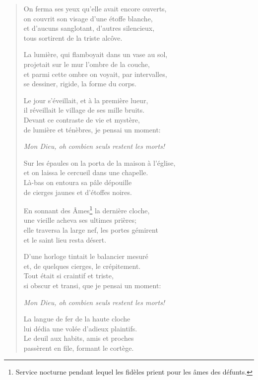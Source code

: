\begin{verse}
  On ferma ses yeux
  qu'elle avait encore ouverts, \\
  on couvrit son visage
  d'une étoffe blanche, \\
  et d'aucuns sanglotant,
  d'autres silencieux, \\
  tous sortirent
  de la triste alcôve.

  La lumière, qui flamboyait
  dans un vase au sol, \\
  projetait sur le mur
  l'ombre de la couche, \\
  et parmi cette ombre
  on voyait, par intervalles, \\
  se dessiner, rigide,
  la forme du corps.

  Le jour s'éveillait,
  et à la première lueur, \\
  il réveillait le village
  de ses mille bruits. \\
  Devant ce contraste
  de vie et mystère, \\
  de lumière et ténèbres,
  je pensai un moment:

  \emph{Mon Dieu, oh combien seuls restent les morts!}

  Sur les épaules on la porta
  de la maison à l'église,\hspace*{-10pt} \\
  et on laissa le cercueil
  dans une chapelle. \\
  Là-bas on entoura
  sa pâle dépouille \\
  de cierges jaunes
  et d'étoffes noires.

  En sonnant des Âmes\footnote{Service nocturne pendant lequel les
  fidèles prient pour les âmes des défunts.}
  la dernière cloche, \\
  une vieille acheva
  ses ultimes prières; \\
  elle traversa la large nef,
  les portes gémirent \\
  et le saint lieu
  resta désert.

  D'une horloge tintait
  le balancier mesuré \\
  et, de quelques cierges,
  le crépitement. \\
  Tout était
  si craintif et triste, \\
  si obscur et transi,
  que je pensai un moment:

  \emph{Mon Dieu, oh combien seuls restent les morts!}

  La langue de fer
  de la haute cloche \\
  lui dédia une volée
  d'adieux plaintifs. \\
  Le deuil aux habits,
  amis et proches \\
  passèrent en file,
  formant le cortège.


\end{verse}
